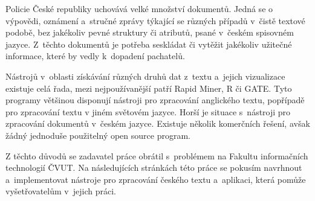 \begin{introduction}
Policie České republiky uchovává velké množství dokumentů. Jedná se o výpovědi, oznámení a~stručné zprávy týkající se různých případů v~čistě textové podobě, bez jakékoliv pevné struktury či atributů, psané v~českém spisovném jazyce. Z~těchto dokumentů je potřeba seskládat či vytěžit jakékoliv užitečné informace, které by vedly k~dopadení pachatelů.

Nástrojů v~oblasti získávání různých druhů dat z~textu a~jejich vizualizace existuje celá řada, mezi nejpoužívanější patří Rapid Miner, R či GATE. Tyto programy většinou disponují nástroji pro zpracování anglického textu, popřípadě pro zpracování textu v jiném světovém jazyce. Horší je situace s~nástroji pro zpracování dokumentů v~českém jazyce. Existuje několik komerčních řešení, avšak žádný jednoduše použitelný open source program.

Z těchto důvodů se zadavatel práce obrátil s~problémem na Fakultu informačních technologií ČVUT. Na následujících stránkách této práce se pokusím navrhnout a~implementovat nástroje pro zpracování českého textu a~aplikaci, která pomůže vyšetřovatelům v~jejich práci.
\end{introduction}